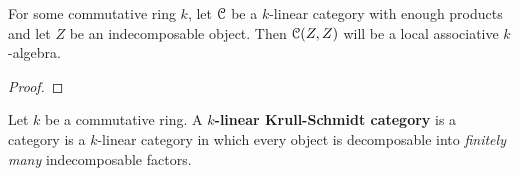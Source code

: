             \begin{proposition} \label{prop: endomorphism_algebras_of_indecomposable_objects}
                For some commutative ring $k$, let $\mathcal{C}$ be a $k$-linear category with enough products and let $Z$ be an indecomposable object. Then $\mathcal{C}(Z, Z)$ will be a local associative $k$-algebra. 
            \end{proposition}
                \begin{proof}
                    
                \end{proof}
            \begin{definition} \label{def: krull_schmidt_categories}
                Let $k$ be a commutative ring. A \textbf{$k$-linear Krull-Schmidt category} is a category is a $k$-linear category in which every object is decomposable into \textit{finitely many} indecomposable factors.
            \end{definition}
            
